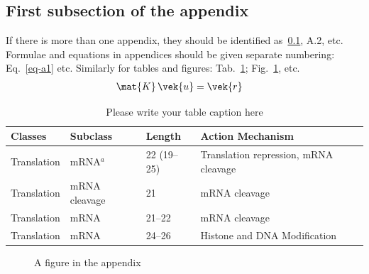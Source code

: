 \documentclass{techmech}
\begin{document}
 \subsection{First subsection of the appendix}
 \label{subsec-a1}
If there is more than one appendix, they should be identified as~\ref{subsec-a1}, A.2, etc. Formulae and equations in
appendices should be given separate numbering: Eq.~\eqref{eq-a1} etc. Similarly for tables and figures: Tab.~\ref{tab-a1}; Fig.~\ref{fig-a1}, etc.
\begin{align}
\mat{K}\,\vek{u}&=\vek{r}
\label{eq-a1}
\end{align}
\begin{table}[b!]
\caption{Please write your table caption here}
\label{tab-a1} 
\begin{tabularx}{\textwidth}{p{2cm}XXX} 
\hline%
Classes & Subclass & Length & Action Mechanism  \\
\hline
Translation & mRNA$^a$  & 22 (19--25) & Translation repression, mRNA cleavage\\
Translation & mRNA cleavage & 21 & mRNA cleavage\\
Translation & mRNA  & 21--22 & mRNA cleavage\\
Translation & mRNA  & 24--26 & Histone and DNA Modification\\
\hline
\end{tabularx}
\end{table}
\begin{figure}[t!]
\caption{A figure in the appendix}
\label{fig-a1}
\end{figure}




\end{document}
